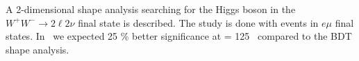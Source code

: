 A 2-dimensional shape analysis searching for the Higgs boson 
in the $W^+W^- \to 2\ell2\nu$ final state is described.
The study is done with events in $e\mu$ final states. 
In \intlumiEightTeV~we expected 25 \% better significance 
at \mHi = 125 \GeV~compared to the BDT shape analysis. 
